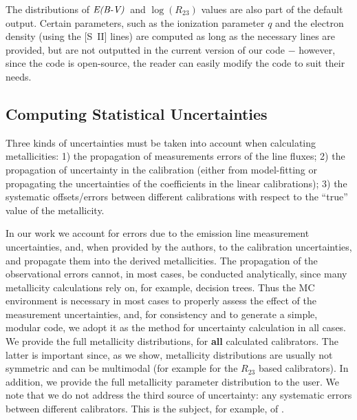 \documentclass{emulateapj}
\newcommand{\ebmv}{\ensuremath{\mathrm{\emph{E(B-V)}}}}
\begin{document}
The distributions of \ebmv~and $\log(R_{23})$ values are also part of
the default output. Certain parameters, such as the ionization
parameter $q$ and the electron density (using the [S~II] lines) are
computed as long as the necessary lines are provided, but are not
outputted in the current version of our code $-$ however, since the
code is open-source, the reader can easily modify the code to suit
their needs.



\subsection{Computing Statistical Uncertainties}\label{sec:uncert}

Three kinds of uncertainties must be taken into account when
calculating metallicities: 1) the propagation of measurements errors
of the line fluxes; 2) the propagation of uncertainty in the
calibration (either from model-fitting or propagating the
uncertainties of the coefficients in the linear calibrations); 3) the
systematic offsets/errors between different calibrations with respect
to the ``true'' value of the metallicity.

In our work we account for errors due to the emission line measurement
uncertainties, and, when provided by the authors, to the calibration
uncertainties, and propagate them into the derived metallicities. The
propagation of the observational errors cannot, in most cases, be
conducted analytically, since many metallicity calculations rely on,
for example, decision trees. Thus the MC environment is necessary in
most cases to properly assess the effect of the measurement
uncertainties, and, for consistency and to generate a simple, modular
code, we adopt it as the method for uncertainty calculation in all
cases.  We provide the full metallicity distributions, for
\textbf{all} calculated calibrators. The latter is important since, as
we show, metallicity distributions are usually not symmetric and can
be multimodal (for example for the $R_{23}$ based calibrators). In
addition, we provide the full metallicity parameter distribution to the
user. We note that we do not address the third source of uncertainty:
any systematic errors between different calibrators. This is the
subject, for example, of \citet{lopezsanchez12}.
\end{document}
